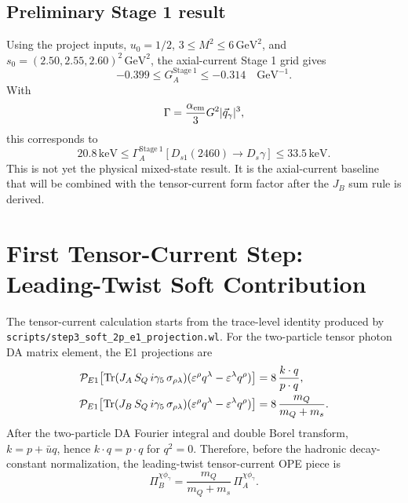 \documentclass[11pt]{article}
\newcommand{\Tr}{\mathrm{Tr}}
\begin{document}
\subsection{Preliminary Stage 1 result}

Using the project inputs, $u_0=1/2$, $3\le M^2\le6\,\mathrm{GeV}^2$, and
$s_0=(2.50,2.55,2.60)^2\,\mathrm{GeV}^2$, the axial-current Stage 1 grid gives
\begin{equation}
  -0.399 \le G_A^{\mathrm{Stage\ 1}} \le -0.314\quad \mathrm{GeV}^{-1}.
\end{equation}
With
\begin{equation}
  \Gamma=\frac{\alpha_{\rm em}}{3}G^2|\vec q_\gamma|^3,
  \label{eq:width}
\end{equation}
this corresponds to
\begin{equation}
  20.8\,\mathrm{keV}
  \le
  \Gamma_A^{\mathrm{Stage\ 1}}[D_{s1}(2460)\to D_s\gamma]
  \le
  33.5\,\mathrm{keV}.
\end{equation}
This is not yet the physical mixed-state result.  It is the axial-current
baseline that will be combined with the tensor-current form factor after the
$J_B$ sum rule is derived.

\section{First Tensor-Current Step: Leading-Twist Soft Contribution}

The tensor-current calculation starts from the trace-level identity produced by
\texttt{scripts/step3\_soft\_2p\_e1\_projection.wl}.  For the two-particle
tensor photon DA matrix element, the E1 projections are
\begin{align}
  {\cal P}_{E1}\!\left[
    \Tr(J_A\,S_Q\,i\gamma_5\,\sigma_{\rho\lambda})
    (\varepsilon^\rho q^\lambda-\varepsilon^\lambda q^\rho)
  \right]
  &=
  8\,\frac{k\cdot q}{p\cdot q},\\
  {\cal P}_{E1}\!\left[
    \Tr(J_B\,S_Q\,i\gamma_5\,\sigma_{\rho\lambda})
    (\varepsilon^\rho q^\lambda-\varepsilon^\lambda q^\rho)
  \right]
  &=
  8\,\frac{m_Q}{m_Q+m_s}.
\end{align}
After the two-particle DA Fourier integral and double Borel transform,
$k=p+\bar u q$, hence $k\cdot q=p\cdot q$ for $q^2=0$.  Therefore, before the
hadronic decay-constant normalization, the leading-twist tensor-current OPE
piece is
\begin{equation}
  \Pi_{B}^{\chi\phi_\gamma}
  =
  \frac{m_Q}{m_Q+m_s}\,
  \Pi_{A}^{\chi\phi_\gamma}.
\end{equation}
\end{document}
